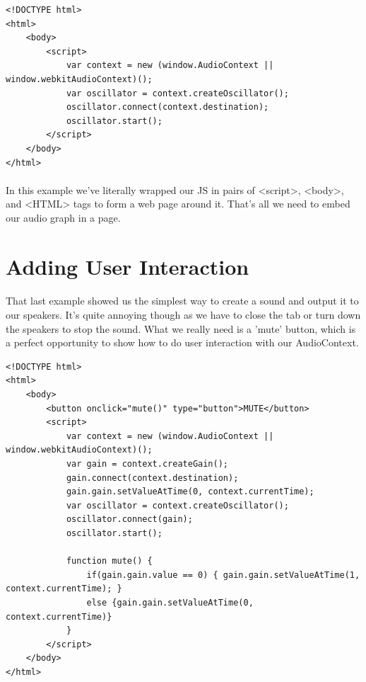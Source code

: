\begin{lstlisting}
<!DOCTYPE html>
<html>
    <body>
        <script>
            var context = new (window.AudioContext || window.webkitAudioContext)();
            var oscillator = context.createOscillator();
            oscillator.connect(context.destination);
            oscillator.start();
        </script>
    </body>
</html>
\end{lstlisting}

\paragraph{} In this example we've literally wrapped our JS in pairs of <script>, <body>, and <HTML> tags to form a web page around it. That's all we need to embed our audio graph in a page.

\section{Adding User Interaction}
\paragraph{} That last example showed us the simplest way to create a sound and output it to our speakers. It's quite annoying though as we have to close the tab or turn down the speakers to stop the sound. What we really need is a 'mute' button, which is a perfect opportunity to show how to do user interaction with our AudioContext.

\begin{lstlisting}
<!DOCTYPE html>
<html>
    <body>
        <button onclick="mute()" type="button">MUTE</button>
        <script>
            var context = new (window.AudioContext || window.webkitAudioContext)();
            var gain = context.createGain();
            gain.connect(context.destination);
            gain.gain.setValueAtTime(0, context.currentTime);
            var oscillator = context.createOscillator();
            oscillator.connect(gain);
            oscillator.start();

            function mute() {
                if(gain.gain.value == 0) { gain.gain.setValueAtTime(1, context.currentTime); }
                else {gain.gain.setValueAtTime(0, context.currentTime)}
            }
        </script>
    </body>
</html>
\end{lstlisting}

